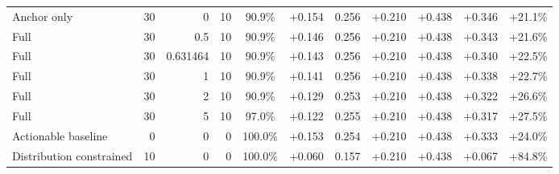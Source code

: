 \begin{table}[htbp]
\begin{tabular}{lrrrccccccc}
Anchor only & 30 & 0 & 10 & 90.9\% & +0.154 & 0.256 & +0.210 & +0.438 & +0.346 & +21.1\% \\
Full & 30 & 0.5 & 10 & 90.9\% & +0.146 & 0.256 & +0.210 & +0.438 & +0.343 & +21.6\% \\
Full & 30 & 0.631464 & 10 & 90.9\% & +0.143 & 0.256 & +0.210 & +0.438 & +0.340 & +22.5\% \\
Full & 30 & 1 & 10 & 90.9\% & +0.141 & 0.256 & +0.210 & +0.438 & +0.338 & +22.7\% \\
Full & 30 & 2 & 10 & 90.9\% & +0.129 & 0.253 & +0.210 & +0.438 & +0.322 & +26.6\% \\
Full & 30 & 5 & 10 & 97.0\% & +0.122 & 0.255 & +0.210 & +0.438 & +0.317 & +27.5\% \\
Actionable baseline & 0 & 0 & 0 & 100.0\% & +0.153 & 0.254 & +0.210 & +0.438 & +0.333 & +24.0\% \\
Distribution constrained & 10 & 0 & 0 & 100.0\% & +0.060 & 0.157 & +0.210 & +0.438 & +0.067 & +84.8\% \\
\bottomrule
\end{tabular}
\end{table}
